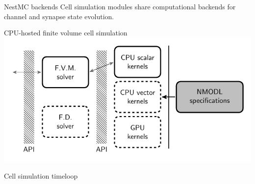 \documentclass[aspectratio=1610,14pt]{beamer}
\begin{document}
\begin{frame}{NestMC backends}
  Cell simulation modules share computational backends for channel and synapse state evolution.

  \vfill
  \centering
  CPU-hosted finite volume cell simulation\\
  \vspace{2ex}
  \includegraphics[height=0.5\textheight]{figs/backend-api.pdf}

  \vfill
\end{frame}

\begin{frame}{Cell simulation timeloop}
  \begin{center}
  \end{center}
\end{frame}
\end{document}
